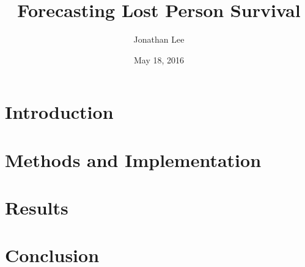 \documentclass[12pt, titlepage]{article}
\begin{document}
  \title{Forecasting Lost Person Survival}
  \author{Jonathan Lee}
  \date{May 18, 2016}
  \maketitle

  \abstract{
  }

  \section{Introduction}

  \section{Methods and Implementation}

  \section{Results}

  \section{Conclusion}
\end{document}
